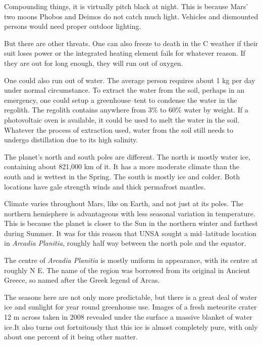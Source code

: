 Compounding things, it is virtually pitch black at night. This is because Mars' two moons Phobos and Deimos do not catch much light. Vehicles and dismounted persons would need proper outdoor lighting.

But there are other threats. One can also freeze to death in the C weather if their suit loses power or the integrated heating element fails for whatever reason. If they are out for long enough, they will run out of oxygen.

One could also run out of water. The average person requires about 1 kg per day under normal circumstance. To extract the water from the soil, perhaps in an emergency, one could setup a greenhouse--tent to condense the water in the regolith. The regolith contains anywhere from 3\% to 60\% water by weight. If a photovoltaic oven is available, it could be used to melt the water in the soil. Whatever the process of extraction used, water from the soil still needs to undergo distillation due to its high salinity.


The planet's north and south poles are different. The north is mostly water ice, containing about 821,000 km of it. It has a more moderate climate than the south and is wettest in the Spring. The south is mostly  ice and colder. Both locations have gale strength winds and thick permafrost mantles.

Climate varies throughout Mars, like on Earth, and not just at its poles. The northern hemisphere is advantageous with less seasonal variation in temperature. This is because the planet is closer to the Sun in the northern winter and farthest during Summer. It was for this reason that UNSA sought a mid--latitude location in {\it Arcadia Planitia}, roughly half way between the north pole and the equator. 

The centre of {\it Arcadia Planitia} is mostly uniform in appearance, with its centre at roughly N E. The name of the region was borrowed from its original in Ancient Greece, so named after the Greek legend of Arcas.

The seasons here are not only more predictable, but there is a great deal of water ice and sunlight for year round greenhouse use. Images of a fresh meteorite crater 12 m across taken in 2008 revealed under the surface a massive blanket of water ice. It also turns out fortuitously that this ice is almost completely pure, with only about one percent of it being other matter.


